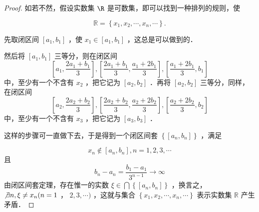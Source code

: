 \begin{proof}
	如若不然，假设实数集 $\R$ 是可数集，即可以找到一种排列的规则，使
	
	$$
	\mathbb{R}=\left\{x_1, x_2, \cdots, x_n, \cdots\right\} .
	$$
	
	
	先取闭区间 $\left[a_1, b_1\right]$ ，使 $x_1 \in\left[a_1, b_1\right]$ ，这总是可以做到的．
	
	然后将 $\left[a_1, b_1\right]$ 三等分，则在闭区间 $$\left[a_1, \dfrac{2 a_1+b_1}{3}\right],\left[\dfrac{2 a_1+b_1}{3}, \dfrac{a_1+2 b_1}{3}\right],\left[\dfrac{a_1+2 b_1}{3}, b_1\right]$$ 中，至少有一个不含有 $x_2$ ，把它记为 $\left[a_2, b_2\right]$ ．再将 $\left[a_2, b_2\right]$ 三等分，同样，在闭区间 $$\left[a_2, \dfrac{2 a_2+b_2}{3}\right],\left[\dfrac{2 a_2+b_2}{3}, \dfrac{a_2+2 b_2}{3}\right],\left[\dfrac{a_2+2 b_2}{3}, b_2\right]$$ 中，至少有一个不含有 $x_3$ ，把它记为 $\left[a_3, b_3\right]$ ．
	
	这样的步骤可一直做下去，于是得到一个闭区间套 $\left\{\left[a_n, b_n\right]\right\}$ ，满足
	
	$$
	x_n \notin\left[a_n, b_n\right], n=1,2,3, \cdots
	$$
	且
	$$
	b_n-a_n=\dfrac{b_1-a_1}{3^{n-1}}\rightarrow\infty
	$$
	由闭区间套定理，存在惟一的实数 $\xi\in\bigcap\left\{\left[a_n,b_n\right]\right\}$ ，换言之，$\not\exists n,\xi \neq x_n(n=1$ ， $2,3, \cdots)$ ，这就与集合 $\left\{x_1, x_2, \cdots, x_n, \cdots\right\}$ 表示实数集 $\mathbb{R}$ 产生矛盾．
\end{proof}
